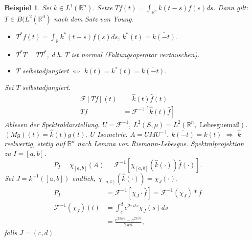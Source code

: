\documentclass[12pt]{extreport} %
\newtheorem{Beispiel}[Satz]{Beispiel}
\numberwithin{equation}{section}
\newcommand{\R}{\mathbb{R}} %
\newcommand{\f}{\hat{f}}
\newcommand{\F}{\mathcal{F}}
\newcommand{\m}{\cdot}
\begin{document}
	\begin{Beispiel}
		Sei $k\in L^1(\R^n)$. Setze $Tf(t) = \int_{\R^n}k(t-s) f(s)ds$. Dann gilt: $T\in B(L^2(\R^d)$ nach dem Satz von Young.
		\begin{itemize}
			\item $T^*f(t) = \int_{\R} k^*(t-s) f(s) ds$, $k^*(t) = \overline{k(-t)}$.
			\item $T^*T = TT^*$, d.h. $T$ ist normal (Faltungsoperator vertauschen).
			\item $T$ selbstadjungiert $\Leftrightarrow$ $k(t) = k^*(t) = \overline{k(-t)}$.
		\end{itemize}
		Sei $T$ selbstadjungiert.
		\begin{align*}
			\F[Tf](t)&= \hat k(t) \hat f(t)\\
			Tf &=\F^{-1}[\hat k (t)\f]
		\end{align*}
		Ablesen der Spektraldarstellung. $U=\F^{-1}$, $L^2(S,\mu) = L^2(\R^n, \text{ Lebesguemaß})$. $(Mg)(t)= \hat k(t) g(t)$, $U$ Isometrie. $A = UMU^{-1}$. $\overline{k(-t)} = k(t)$ $\Rightarrow$ $\hat k$ reelwertig, stetig auf $\R^n$ nach Lemma von Riemann-Lebesgue. Spektralprojektion zu $I = [a,b]$. 
		$$P_I = \chi_{[a,b]}(A) = \F^{-1}[\chi_{[a,b]}(\hat k(\m))\f(\m)].$$
		Sei $J = k^{-1}([a,b])$ endlich, $\chi_{[a,b]}(\hat k(\m)) = \chi_J(\m)$.
		\begin{align*}
			P_I &= \F^{-1}[\chi_J\m \f] = \F^{-1}(\chi_J)* f\\
			\F^{-1}(\chi_J)(t) &= \int_c^d e^{2\pi i t s}\chi_J(s) ds \\
			&=  \frac{e^{2\pi i t d} - e^{2\pi i t c}}{2\pi i t},
		\end{align*}
		falls $J = (c,d)$.
	\end{Beispiel}
	
\end{document}
